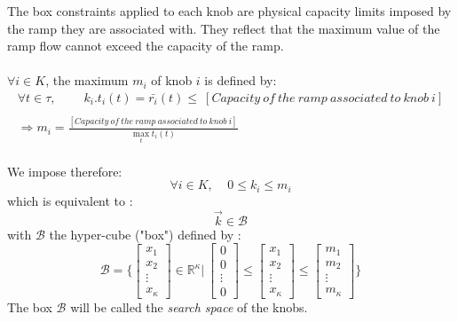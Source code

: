 The box constraints applied to each knob are physical capacity limits imposed by the ramp they are associated with. They reflect that the maximum value of the ramp flow cannot exceed the capacity of the ramp.\\
\\
$\forall i\in{K}$, the maximum $m_{i}$ of knob $i$ is defined by:
	\\
\begin{align*}
	\forall t \in \tau,\ \ \ \ \ \ \ \ \ \ k_{i}.t_{i}(t)=\bar{r_{i}}(t)\leq\ [Capacity\ of\ the\ ramp\ associated\ to\ knob\ i]\\
	\\
	\Rightarrow m_{i}=\frac{[Capacity\ of\ the\ ramp\ associated\ to\ knob\ i]}{\max_{t} t_{i}(t)}
\end{align*}
	\\
	We impose therefore: \\
\begin{equation*}
		\forall i\in{K},\ \ \ \ \ 0\leq k_{i}\leq m_{i}
\end{equation*}
which is equivalent to :\\
\begin{equation}
	\label{eq:naive}
	\vec{k}\in\mathscr{B}
\end{equation}
with $\mathscr{B}$ the hyper-cube ("box") defined by :\\
\begin{equation*}
	\mathscr{B}=\Bigg\{\begin{bmatrix}x_{1}\\x_{2}\\\vdots\\x_{\kappa}\end{bmatrix}\in\mathds{R}^{\kappa}\Bigg| \ \begin{bmatrix}0\\0\\\vdots\\0\end{bmatrix}\leq\begin{bmatrix}x_{1}\\x_{2}\\\vdots\\x_{\kappa}\end{bmatrix}\leq\begin{bmatrix}m_{1}\\m_{2}\\\vdots\\m_{\kappa}\end{bmatrix}\Bigg\}
\end{equation*}
The box $\mathscr{B}$ will be called the \emph{search space} of the knobs.\\




	